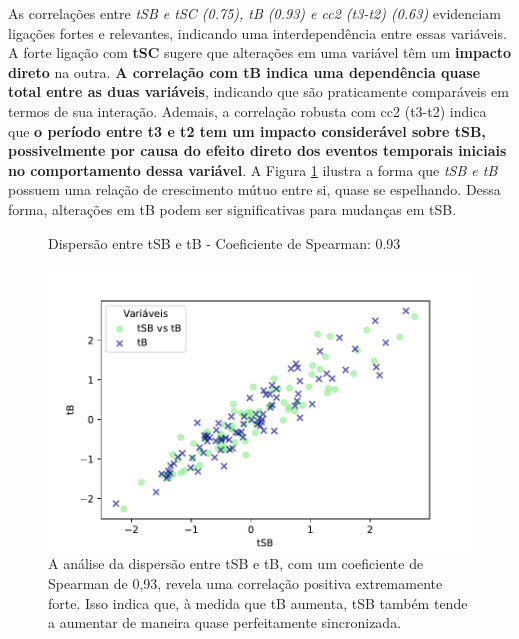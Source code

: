 As correlações entre \textit{tSB e tSC (0.75), tB (0.93) e cc2 (t3-t2) (0.63)} evidenciam ligações fortes e relevantes, indicando uma interdependência entre essas variáveis. A forte ligação com \textbf{tSC} sugere que alterações em uma variável têm um \textbf{impacto direto} na outra. \textbf{A correlação com tB indica uma dependência quase total entre as duas variáveis}, indicando que são praticamente comparáveis em termos de sua interação. Ademais, a correlação robusta com cc2 (t3-t2) indica que \textbf{o período entre t3 e t2 tem um impacto considerável sobre tSB, possivelmente por causa do efeito direto dos eventos temporais iniciais no comportamento dessa variável}. A Figura \ref{fig:tSB-tB} ilustra a forma que \textit{tSB e tB} possuem uma relação de crescimento mútuo entre si, quase se espelhando. Dessa forma, alterações em tB podem ser significativas para mudanças em tSB.

\begin{figure}[h]
    \captionsetup{font=footnotesize, justification=centering, labelsep=period, position=above}
    \caption{Dispersão entre tSB e tB - Coeficiente de Spearman: 0.93}
    \label{fig:tSB-tB}
    \centering
    \includegraphics[scale=0.40]{figuras/Spearman/tSB-tB.pdf}
    \vspace{0.3cm} 
    \caption{A análise da dispersão entre tSB e tB, com um coeficiente de Spearman de 0,93, revela uma correlação positiva extremamente forte. Isso indica que, à medida que tB aumenta, tSB também tende a aumentar de maneira quase perfeitamente sincronizada.}
    \begin{minipage}{\linewidth}
        \centering
    \end{minipage}
\end{figure}
\FloatBarrier

